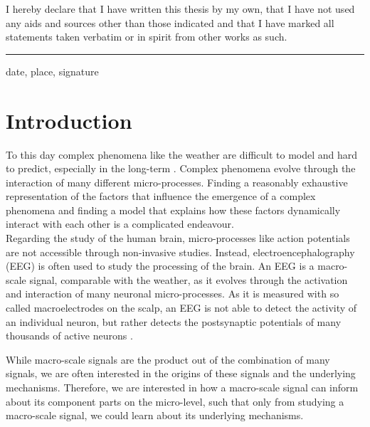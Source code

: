 \documentclass[12pt]{extreport}
\begin{document}
I hereby declare that I have written this thesis by my own, that I have not used any aids and sources other than those indicated and that I have marked all statements taken verbatim or in spirit from other works as such.



\vspace{60px}


\par\noindent\rule{\textwidth}{0.4pt}

date, place, signature


\tableofcontents

\chapter{Introduction}

To this day complex phenomena like the weather are difficult to model and hard to predict, especially in the long-term \citep{moosavi2021machine}. Complex phenomena evolve through the interaction of many different micro-processes. Finding a reasonably exhaustive representation of the factors that influence the emergence of a complex phenomena and finding a model that explains how these factors dynamically interact with each other is a complicated endeavour. \\

Regarding the study of the human brain, micro-processes like action potentials are not accessible through non-invasive studies. Instead,  electroencephalography (EEG) is often used to study the processing of the brain. An EEG is a macro-scale signal, comparable with the weather, as it evolves through the activation and interaction of many neuronal micro-processes. As it is measured with so called macroelectrodes on the scalp, an EEG is not able to detect the activity of an individual neuron, but rather detects the postsynaptic potentials of many thousands of active neurons \citep{carlson2007physiology}. 

While macro-scale signals are the product out of the combination of many signals, we are often interested in the origins of these signals and the underlying mechanisms. Therefore, we are interested in how a macro-scale signal can inform about its component parts on the micro-level, such that only from studying a macro-scale signal, we could learn about its underlying mechanisms.
\end{document}

